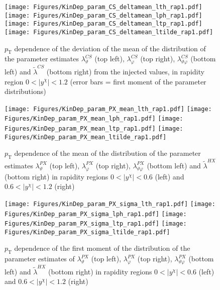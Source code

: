 \documentclass[12pt]{article}
\newcommand{\pT}{p_\mathrm{T}}
\newcommand{\absy}{\left |  y^{\chi} \right |}
\newcommand{\lamthCS}{\lambda^{\scriptscriptstyle CS}_\vartheta}
\newcommand{\lamphCS}{\lambda^{\scriptscriptstyle CS}_\varphi}
\newcommand{\lamthphCS}{\lambda^{\scriptscriptstyle CS}_{\vartheta \varphi}}
\newcommand{\lamtildeCS}{\tilde{\lambda}^{\scriptscriptstyle CS}}
\newcommand{\lamtildeHX}{\tilde{\lambda}^{\scriptscriptstyle HX}}
\newcommand{\lamthPX}{\lambda^{\scriptscriptstyle PX}_\vartheta}
\newcommand{\lamphPX}{\lambda^{\scriptscriptstyle PX}_\varphi}
\newcommand{\lamthphPX}{\lambda^{\scriptscriptstyle PX}_{\vartheta \varphi}}
\begin{document}




\begin{figure}[htbp]
\centering
\texttt{[image: Figures/KinDep\_param\_CS\_deltamean\_lth\_rap1.pdf]}
\texttt{[image: Figures/KinDep\_param\_CS\_deltamean\_lph\_rap1.pdf]}
\texttt{[image: Figures/KinDep\_param\_CS\_deltamean\_ltp\_rap1.pdf]}
\texttt{[image: Figures/KinDep\_param\_CS\_deltamean\_ltilde\_rap1.pdf]}
\caption{$\pT$ dependence of the deviation of the mean of the distribution of
the parameter estimates $\lamthCS$ (top left), $\lamphCS$ (top right), $\lamthphCS$
(bottom left) and $\lamtildeCS$ (bottom right) from the injected values, in rapidity region $0<\absy<1.2$ (error bars = first moment of the parameter
distributions)}
\end{figure}
\clearpage
















\begin{figure}[htbp]
\centering
\texttt{[image: Figures/KinDep\_param\_PX\_mean\_lth\_rap1.pdf]}
\texttt{[image: Figures/KinDep\_param\_PX\_mean\_lph\_rap1.pdf]}
\texttt{[image: Figures/KinDep\_param\_PX\_mean\_ltp\_rap1.pdf]}
\texttt{[image: Figures/KinDep\_param\_PX\_mean\_ltilde\_rap1.pdf]}
\caption{$\pT$ dependence of the mean of the distribution of the parameter estimates $\lamthPX$ (top left), $\lamphPX$ (top right), $\lamthphPX$
(bottom left) and $\lamtildeHX$ (bottom right) in rapidity regions $0<\absy<0.6$ (left) and $0.6<\absy<1.2$ (right)}
\end{figure}
\clearpage

\begin{figure}[htbp]
\centering
\texttt{[image: Figures/KinDep\_param\_PX\_sigma\_lth\_rap1.pdf]}
\texttt{[image: Figures/KinDep\_param\_PX\_sigma\_lph\_rap1.pdf]}
\texttt{[image: Figures/KinDep\_param\_PX\_sigma\_ltp\_rap1.pdf]}
\texttt{[image: Figures/KinDep\_param\_PX\_sigma\_ltilde\_rap1.pdf]}
\caption{$\pT$ dependence of the first moment of the distribution of the parameter estimates of $\lamthPX$ (top left), $\lamphPX$ (top right), $\lamthphPX$
(bottom left) and $\lamtildeHX$ (bottom right) in rapidity regions $0<\absy<0.6$ (left) and $0.6<\absy<1.2$ (right)}
\end{figure}
\clearpage
\end{document}
